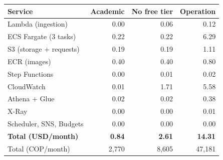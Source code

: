 \begin{tabular}{@{}lrrr@{}}
\toprule
Service & Academic & No free tier & Operation \\
\midrule
Lambda (ingestion) & 0.00 & 0.06 & 0.12 \\
ECS Fargate (3 tasks) & 0.22 & 0.22 & 6.29 \\
S3 (storage + requests) & 0.19 & 0.19 & 1.11 \\
ECR (images) & 0.40 & 0.40 & 0.80 \\
Step Functions & 0.00 & 0.01 & 0.02 \\
CloudWatch & 0.01 & 1.71 & 5.58 \\
Athena + Glue & 0.02 & 0.02 & 0.38 \\
X-Ray & 0.00 & 0.00 & 0.01 \\
Scheduler, SNS, Budgets & 0.00 & 0.00 & 0.00 \\
\midrule
\textbf{Total (USD/month)} & \textbf{0.84} & \textbf{2.61} & \textbf{14.31} \\
Total (COP/month) & 2{,}770 & 8{,}605 & 47{,}181 \\
\bottomrule
\end{tabular}
